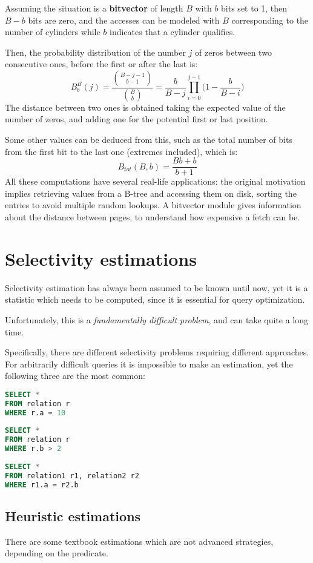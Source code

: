 Assuming the situation is a \textbf{bitvector} of length $B$ with $b$ bits set to 1, then $B - b$ bits are zero, and the accesses can be modeled with $B$ corresponding to the number of cylinders while $b$ indicates that a cylinder qualifies.

Then, the probability distribution of the number $j$ of zeros between two consecutive ones, before the first or after the last is:
$$B^B_b(j) = \frac{{B-j-1\choose b-1}}{{B\choose b}} = \frac{b}{B-j}\prod_{i=0}^{j-1} \Big( 1 - \frac{b}{B - i}\Big)$$
The distance between two ones is obtained taking the expected value of the number of zeros, and adding one for the potential first or last position.

Some other values can be deduced from this, such as the total number of bits from the first bit to the last one (extremes included), which is:
$$B_{tot}(B, b) = \frac{Bb + b}{b + 1}$$
All these computations have several real-life applications: the original motivation implies retrieving values from a B-tree and accessing them on disk, sorting the entries to avoid multiple random lookups. A bitvector module gives information about the distance between pages, to understand how expensive a fetch can be.

\section{Selectivity estimations}
Selectivity estimation has always been assumed to be known until now, yet it is a statistic which needs to be computed, since it is essential for query optimization.

Unfortunately, this is a \textit{fundamentally difficult problem}, and can take quite a long time.

Specifically, there are different selectivity problems requiring different approaches. For arbitrarily difficult queries it is impossible to make an estimation, yet the following three are the most common:

\begin{lstlisting}[language=SQL]
SELECT *
FROM relation r
WHERE r.a = 10
	
SELECT *
FROM relation r
WHERE r.b > 2
	
SELECT *
FROM relation1 r1, relation2 r2
WHERE r1.a = r2.b
\end{lstlisting}

\subsection{Heuristic estimations}
There are some textbook estimations which are not advanced strategies, depending on the predicate.

